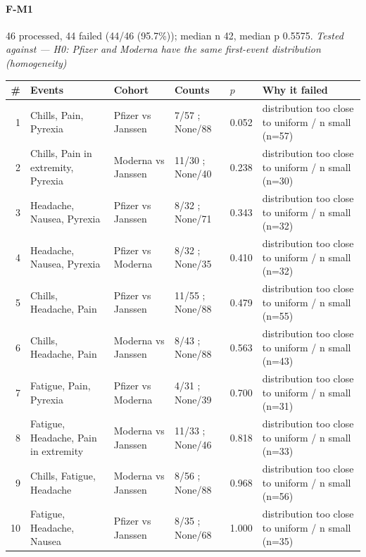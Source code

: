 \documentclass[11pt]{article}
\begin{document}
\paragraph{F-M1} 46 processed, 44 failed (44/46 (95.7\%)); median n 42, median p 0.5575. \emph{Tested against --- H0: Pfizer and Moderna have the same first-event distribution (homogeneity)} \\
\begin{longtable}{@{}r p{3.9cm} p{2.5cm} l l p{4.4cm}@{}}
\toprule
\# & Events & Cohort & Counts & $p$ & Why it failed \\
\midrule \endhead
1 & Chills, Pain, Pyrexia & Pfizer vs Janssen & 7/57 ; None/88 & 0.052 & distribution too close to uniform / n small (n=57) \\
2 & Chills, Pain in extremity, Pyrexia & Moderna vs Janssen & 11/30 ; None/40 & 0.238 & distribution too close to uniform / n small (n=30) \\
3 & Headache, Nausea, Pyrexia & Pfizer vs Janssen & 8/32 ; None/71 & 0.343 & distribution too close to uniform / n small (n=32) \\
4 & Headache, Nausea, Pyrexia & Pfizer vs Moderna & 8/32 ; None/35 & 0.410 & distribution too close to uniform / n small (n=32) \\
5 & Chills, Headache, Pain & Pfizer vs Janssen & 11/55 ; None/88 & 0.479 & distribution too close to uniform / n small (n=55) \\
6 & Chills, Headache, Pain & Moderna vs Janssen & 8/43 ; None/88 & 0.563 & distribution too close to uniform / n small (n=43) \\
7 & Fatigue, Pain, Pyrexia & Pfizer vs Moderna & 4/31 ; None/39 & 0.700 & distribution too close to uniform / n small (n=31) \\
8 & Fatigue, Headache, Pain in extremity & Moderna vs Janssen & 11/33 ; None/46 & 0.818 & distribution too close to uniform / n small (n=33) \\
9 & Chills, Fatigue, Headache & Moderna vs Janssen & 8/56 ; None/88 & 0.968 & distribution too close to uniform / n small (n=56) \\
10 & Fatigue, Headache, Nausea & Pfizer vs Janssen & 8/35 ; None/68 & 1.000 & distribution too close to uniform / n small (n=35) \\
\bottomrule
\end{longtable}
\end{document}
